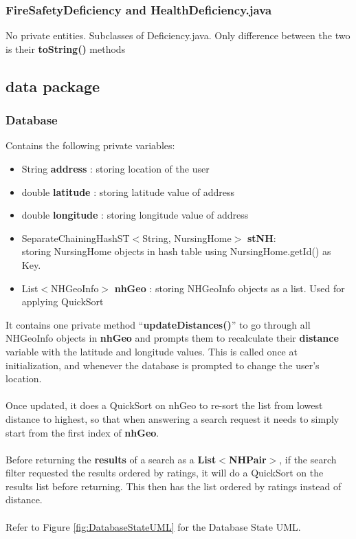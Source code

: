 \documentclass[12pt]{article}
\begin{document}
\subsubsection{FireSafetyDeficiency and HealthDeficiency.java}
No private entities. Subclasses of Deficiency.java. Only difference between the two is their \textbf{toString()} methods
\newpage
\subsection{data package}
\subsubsection{Database}
Contains the following private variables:
\begin{itemize}
\item String \textbf{address} : storing location of the user
\item double \textbf{latitude} : storing latitude value of address
\item double \textbf{longitude} : storing longitude value of address
\item SeparateChainingHashST$<$String, NursingHome$>$ \textbf{stNH}: \\storing NursingHome objects in hash table using NursingHome.getId() as Key. 
\item List$<$NHGeoInfo$>$ \textbf{nhGeo} : storing NHGeoInfo objects as a list. Used for applying QuickSort
\end{itemize}
It contains one private method ``\textbf{updateDistances()}'' to go through all NHGeoInfo objects in \textbf{nhGeo} and prompts them to recalculate their \textbf{distance} variable with the latitude and longitude values. This is called once at initialization, and whenever the database is prompted to change the user's location. \\ \\
Once updated, it does a QuickSort on nhGeo to re-sort the list from lowest distance to highest, so that when answering a search request it needs to simply start from the first index of \textbf{nhGeo}. \\ \\
Before returning the \textbf{results} of a search as a \textbf{List$<$NHPair$>$}, if the search filter requested the results ordered by ratings, it will do a QuickSort on the results list before returning. This then has the list ordered by ratings instead of distance.
\\ \\
Refer to Figure \ref{fig:DatabaseStateUML} for the Database State UML.
\end{document}
